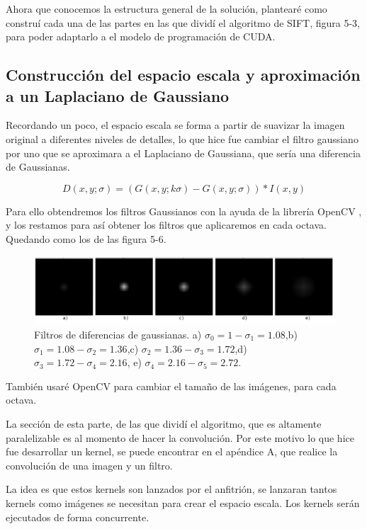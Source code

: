 Ahora que conocemos la estructura general de la solución, plantearé como construí cada una de las partes en las que dividí el algoritmo de SIFT, figura 5-3,  para poder adaptarlo a el modelo de programación de CUDA.

\subsection{Construcción del espacio escala y aproximación a un Laplaciano de Gaussiano}

Recordando un poco, el espacio escala se forma a partir de suavizar la imagen original a diferentes niveles de detalles, lo que hice fue cambiar el filtro gaussiano por uno que se aproximara a el Laplaciano de Gaussiana, que sería una diferencia de Gaussianas. 

$$D(x,y;\sigma) = (G(x,y;k\sigma) - G(x,y;\sigma)) * I(x,y)$$ 

Para ello obtendremos los filtros Gaussianos con la ayuda de la librería OpenCV \cite{Opencv}, y los restamos para así obtener los filtros que aplicaremos en cada octava. Quedando como los de las figura 5-6.


\begin{figure}[h]
			\centering
				\includegraphics[scale=0.2]{img/DoG.jpg}
			\caption{Filtros de diferencias de gaussianas. a) $\sigma_{0}=1-\sigma_{1}=1.08$,b) $\sigma_{1}=1.08-\sigma_{2}=1.36$,c) $\sigma_{2}=1.36-\sigma_{3}=1.72$,d) $\sigma_{3}=1.72-\sigma_{4}=2.16$, e) $\sigma_{4}=2.16-\sigma_{5}=2.72$. }
\end{figure}



 


También usaré OpenCV para cambiar el tamaño de las imágenes, para cada octava.

La sección de esta parte, de las que dividí el algoritmo, que es altamente paralelizable es al momento de hacer la convolución. Por este motivo lo que hice fue desarrollar un kernel, se puede encontrar en el apéndice A, que realice la convolución de una imagen y un filtro.

\pagebreak
 
La idea es que estos kernels son lanzados por el anfitrión, se lanzaran tantos kernels como imágenes se necesitan para crear el espacio escala. Los kernels serán ejecutados de forma concurrente. 

